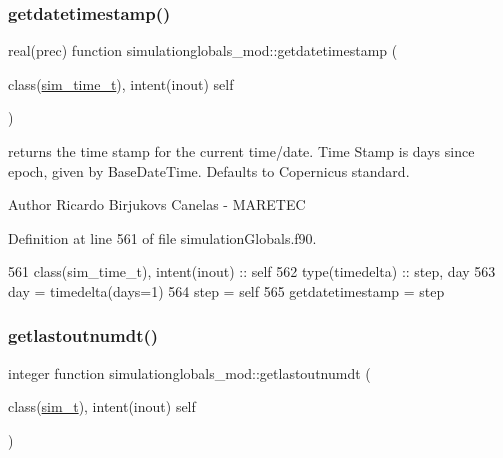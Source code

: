 \mbox{\label{namespacesimulationglobals__mod_a1fd33b50ae2216b3b7db074da1672398}} 
\subsubsection{\texorpdfstring{getdatetimestamp()}{getdatetimestamp()}}
{\footnotesize\ttfamily real(prec) function simulationglobals\+\_\+mod\+::getdatetimestamp (\begin{DoxyParamCaption}\item[{class(\mbox{\hyperlink{structsimulationglobals__mod_1_1sim__time__t}{sim\+\_\+time\+\_\+t}}), intent(inout)}]{self }\end{DoxyParamCaption})\hspace{0.3cm}{\ttfamily [private]}}



returns the time stamp for the current time/date. Time Stamp is days since epoch, given by Base\+Date\+Time. Defaults to Copernicus standard. 

\begin{DoxyAuthor}{Author}
Ricardo Birjukovs Canelas -\/ M\+A\+R\+E\+T\+EC 
\end{DoxyAuthor}


Definition at line 561 of file simulation\+Globals.\+f90.


\begin{DoxyCode}
561     \textcolor{keywordtype}{class}(sim\_time\_t), \textcolor{keywordtype}{intent(inout)} :: self
562     \textcolor{keywordtype}{type}(timedelta) :: step, day
563     day = timedelta(days=1)
564     step = self%
565     getdatetimestamp = step%
\end{DoxyCode}
\mbox{\label{namespacesimulationglobals__mod_ac643661b27d17726e0305e34370de5c3}} 
\subsubsection{\texorpdfstring{getlastoutnumdt()}{getlastoutnumdt()}}
{\footnotesize\ttfamily integer function simulationglobals\+\_\+mod\+::getlastoutnumdt (\begin{DoxyParamCaption}\item[{class(\mbox{\hyperlink{structsimulationglobals__mod_1_1sim__t}{sim\+\_\+t}}), intent(inout)}]{self }\end{DoxyParamCaption})\hspace{0.3cm}{\ttfamily [private]}}



